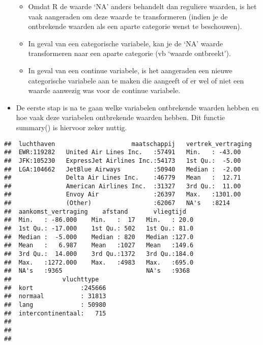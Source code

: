\documentclass[]{memoir}
\providecommand{\tightlist}{%
  \setlength{\itemsep}{0pt}\setlength{\parskip}{0pt}}
\begin{document}
\begin{itemize}
  \begin{itemize}
  \tightlist
  \item
    Omdat R de waarde `NA' anders behandelt dan reguliere waarden, is
    het vaak aangeraden om deze waarde te transformeren (indien je de
    ontbrekende waarden als een aparte categorie wenst te beschouwen).
  \item
    In geval van een categorische variabele, kan je de `NA' waarde
    transformeren naar een aparte categorie (vb `waarde ontbreekt').
  \item
    In geval van een continue variabele, is het aangeraden een nieuwe
    categorische variabele aan te maken die aangeeft of er wel of niet
    een waarde aanwezig was voor de continue variabele.
  \end{itemize}
\item
  De eerste stap is na te gaan welke variabelen ontbrekende waarden
  hebben en hoe vaak deze variabelen ontbrekende waarden hebben. Dit
  functie summary() is hiervoor zeker nuttig.
\end{itemize}

\begin{verbatim}
##  luchthaven                     maatschappij   vertrek_vertraging
##  EWR:119282   United Air Lines Inc.   :57491   Min.   : -43.00   
##  JFK:105230   ExpressJet Airlines Inc.:54173   1st Qu.:  -5.00   
##  LGA:104662   JetBlue Airways         :50940   Median :  -2.00   
##               Delta Air Lines Inc.    :46779   Mean   :  12.71   
##               American Airlines Inc.  :31327   3rd Qu.:  11.00   
##               Envoy Air               :26397   Max.   :1301.00   
##               (Other)                 :62067   NA's   :8214      
##  aankomst_vertraging    afstand       vliegtijd    
##  Min.   : -86.000    Min.   :  17   Min.   : 20.0  
##  1st Qu.: -17.000    1st Qu.: 502   1st Qu.: 81.0  
##  Median :  -5.000    Median : 820   Median :127.0  
##  Mean   :   6.987    Mean   :1027   Mean   :149.6  
##  3rd Qu.:  14.000    3rd Qu.:1372   3rd Qu.:184.0  
##  Max.   :1272.000    Max.   :4983   Max.   :695.0  
##  NA's   :9365                       NA's   :9368   
##              vluchttype    
##  kort             :245666  
##  normaal          : 31813  
##  lang             : 50980  
##  intercontinentaal:   715  
##                            
##                            
## 
\end{verbatim}
\end{document}
